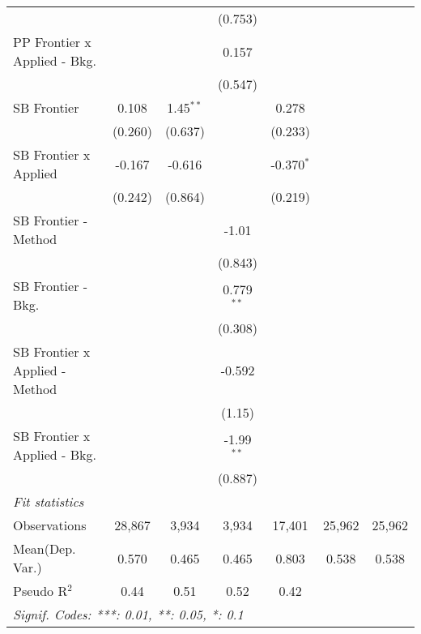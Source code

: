 \begin{tabular}{lcccccc}
                                  &               &              & (0.753)       &               &        &   \\   
   PP Frontier x Applied - Bkg.   &               &              & 0.157         &               &        &   \\   
                                  &               &              & (0.547)       &               &        &   \\   
   SB Frontier                    & 0.108         & 1.45$^{**}$  &               & 0.278         &        &   \\   
                                  & (0.260)       & (0.637)      &               & (0.233)       &        &   \\   
   SB Frontier x Applied          & -0.167        & -0.616       &               & -0.370$^{*}$  &        &   \\   
                                  & (0.242)       & (0.864)      &               & (0.219)       &        &   \\   
   SB Frontier - Method           &               &              & -1.01         &               &        &   \\   
                                  &               &              & (0.843)       &               &        &   \\   
   SB Frontier - Bkg.             &               &              & 0.779$^{**}$  &               &        &   \\   
                                  &               &              & (0.308)       &               &        &   \\   
   SB Frontier x Applied - Method &               &              & -0.592        &               &        &   \\   
                                  &               &              & (1.15)        &               &        &   \\   
   SB Frontier x Applied - Bkg.   &               &              & -1.99$^{**}$  &               &        &   \\   
                                  &               &              & (0.887)       &               &        &   \\   
   \midrule
   \emph{Fit statistics}\\
   Observations                   & 28,867        & 3,934        & 3,934         & 17,401        & 25,962 & 25,962\\  
Mean(Dep. Var.) & 0.570 & 0.465 & 0.465 & 0.803 & 0.538 & 0.538 \\
   Pseudo R$^2$                   & 0.44          & 0.51         & 0.52          & 0.42          &        & \\  
   \midrule \midrule
   \multicolumn{7}{l}{\emph{Signif. Codes: ***: 0.01, **: 0.05, *: 0.1}}\\
\end{tabular}
\par\endgroup

